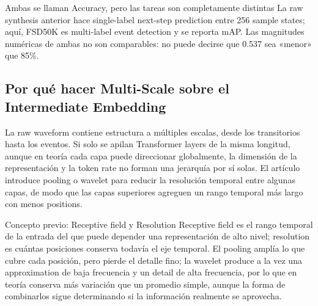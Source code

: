 \begin{warningbox}{Ambas se llaman Accuracy, pero las tareas son completamente distintas}
La raw synthesis anterior hace single-label next-step prediction entre 256 sample states; aquí, FSD50K es multi-label event detection y se reporta mAP. Las magnitudes numéricas de ambas no son comparables: no puede decirse que 0.537 sea «menor» que 85\%.
\end{warningbox}

\subsection{Por qué hacer Multi-Scale sobre el Intermediate Embedding}

La raw waveform contiene estructura a múltiples escalas, desde los transitorios hasta los eventos. Si solo se apilan Transformer layers de la misma longitud, aunque en teoría cada capa puede direccionar globalmente, la dimensión de la representación y la token rate no forman una jerarquía por sí solas. El artículo introduce pooling o wavelet para reducir la resolución temporal entre algunas capas, de modo que las capas superiores agreguen un rango temporal más largo con menos positions.


\begin{knowledgebox}{Concepto previo: Receptive field y Resolution}
Receptive field es el rango temporal de la entrada del que puede depender una representación de alto nivel; resolution es cuántas posiciones conserva todavía el eje temporal. El pooling amplía lo que cubre cada posición, pero pierde el detalle fino; la wavelet produce a la vez una approximation de baja frecuencia y un detail de alta frecuencia, por lo que en teoría conserva más variación que un promedio simple, aunque la forma de combinarlos sigue determinando si la información realmente se aprovecha.
\end{knowledgebox}


